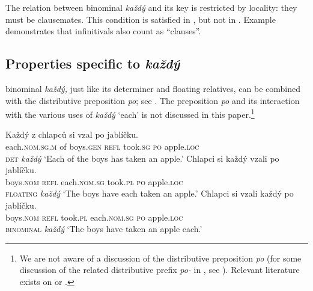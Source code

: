 \documentclass[output=paper,colorlinks,citecolor=brown,newtxmath]{langscibook}
\begin{document}
\noindent The relation between binominal \textit{každý} and its key is restricted by locality: they must be clausemates. This condition is satisfied in , but not in . Example  demonstrates that infinitivals also count as ``clauses''.

\ea{}
\z\z

\subsection{Properties specific to \textit{každý}}\label{s2.2}

 binominal \textit{každý,} just like its determiner and floating relatives, can be combined with the distributive preposition \textit{po}; see . The preposition \textit{po} and its interaction with the various uses of \textit{každý} `each' is not discussed in this paper.\footnote{We are not aware of a discussion of the  distributive preposition \textit{po} (for some discussion of the related distributive prefix \textit{po-} in , see \citealt{Biskup2017}). Relevant literature exists on  \citep{Pesetsky1982,Harves2003,Kuznetsova2005} or  \citep{Przepiorkowski2008,Przepiorkowski2013}.}

\ea\label{ex:po}\ea\label{ex:po-without}\gll Každý z chlapců si vzal po jablíčku.\\
each.\textsc{nom.sg.m} of boys.\textsc{gen} \textsc{refl} took.\textsc{sg} \textsc{po} apple.\textsc{loc}\\\hfill \textsc{det} \textit{každý}
\glt `Each of the boys has taken an apple.'
\ex\label{ex:po-float}\gll Chlapci si každý vzali po jablíčku.\\
boys.\textsc{nom} \textsc{refl} each.\textsc{nom.sg} took.\textsc{pl} \textsc{po} apple.\textsc{loc}\\\hfill \textsc{floating} \textit{každý}
\glt `The boys have each taken an apple.'
\ex\label{ex:po-binom}\gll Chlapci si vzali každý po jablíčku.\\
boys.\textsc{nom} \textsc{refl} took.\textsc{pl} each.\textsc{nom.sg} \textsc{po} apple.\textsc{loc}\\\hfill \textsc{binominal} \textit{každý}
\glt `The boys have taken an apple each.'
\z\z
\end{document}
